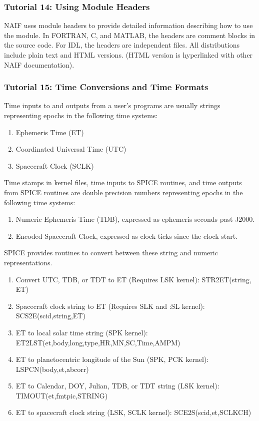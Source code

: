 \documentclass[crop=false,class=book]{standalone}
\begin{document}
            \subsubsection{Tutorial 14: Using Module Headers}
            NAIF uses module headers to provide detailed information describing how to use the module. In FORTRAN, C, and MATLAB, the headers are comment blocks in the source code. For IDL, the headers are independent files. All distributions include plain text and HTML versions. (HTML version is hyperlinked with other NAIF documentation). 
            \subsubsection{Tutorial 15: Time Conversions and Time Formats}
            Time inputs to and outputs from a user's programs are usually strings representing epochs in the following time systems:
            \begin{enumerate}
                \item Ephemeris Time (ET)
                \item Coordinated Universal Time (UTC)
                \item Spacecraft Clock (SCLK)
            \end{enumerate}
            Time stamps in kernel files, time inputs to SPICE routines, and time outputs from SPICE routines are double precision numbers representing epochs in the following time systems:
            \begin{enumerate}
                \item Numeric Ephemeris Time (TDB), expressed as ephemeris seconds past J2000.
                \item Encoded Spacecraft Clock, expressed as clock ticks since the clock start.
            \end{enumerate}
            SPICE provides routines to convert between these string and numeric representations.
            \begin{enumerate}
                \item Convert UTC, TDB, or TDT to ET (Requires LSK kernel): STR2ET(string, ET)
                \item Spacecraft clock string to ET (Requires SLK and :SL kernel): SCS2E(scid,string,ET)
                \item ET to local solar time string (SPK kernel): ET2LST(et,body,long,type,HR,MN,SC,Time,AMPM)
                \item ET to planetocentric longitude of the Sun (SPK, PCK kernel): LSPCN(body,et,abcorr)
                \item ET to Calendar, DOY, Julian, TDB, or TDT string (LSK kernel): TIMOUT(et,fmtpic,STRING)
                \item ET to spacecraft clock string (LSK, SCLK kernel): SCE2S(scid,et,SCLKCH)
            \end{enumerate}
\end{document}

